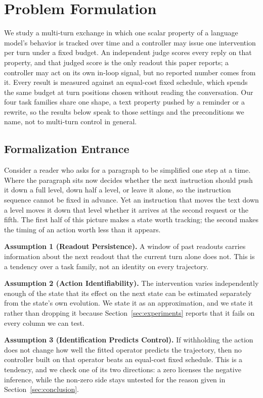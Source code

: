 \section{Problem Formulation}
\label{sec:problem}

We study a multi-turn exchange in which one scalar property of a language model's behavior is
tracked over time and a controller may issue one intervention per turn under a fixed budget.
An independent judge scores every reply on that property, and that judged score is the only
readout this paper reports; a controller may act on its own in-loop signal, but no reported number
comes from it. Every result is measured against an equal-cost fixed schedule, which spends the
same budget at turn positions chosen without reading the conversation. Our four task families
share one shape, a text property pushed by a reminder or a rewrite, so the results below speak to
those settings and the preconditions we name, not to multi-turn control in general.

\subsection*{Formalization Entrance}

Consider a reader who asks for a paragraph to be simplified one step at a time. Where the
paragraph sits now decides whether the next instruction should push it down a full level, down
half a level, or leave it alone, so the instruction sequence cannot be fixed in advance. Yet an
instruction that moves the text down a level moves it down that level whether it arrives at the
second request or the fifth. The first half of this picture makes a state worth tracking; the
second makes the timing of an action worth less than it appears.

\textbf{Assumption 1 (Readout Persistence).} A window of past readouts carries information about
the next readout that the current turn alone does not. This is a tendency over a task family,
not an identity on every trajectory.

\textbf{Assumption 2 (Action Identifiability).} The intervention varies independently enough of
the state that its effect on the next state can be estimated separately from the state's own
evolution. We state it as an approximation, and we state it rather than dropping it because
Section~\ref{sec:experiments} reports that it fails on every column we can test.

\textbf{Assumption 3 (Identification Predicts Control).} If withholding the action does not
change how well the fitted operator predicts the trajectory, then no controller built on that
operator beats an equal-cost fixed schedule. This is a tendency, and we check one of its two
directions: a zero licenses the negative inference, while the non-zero side stays untested for
the reason given in Section~\ref{sec:conclusion}.

